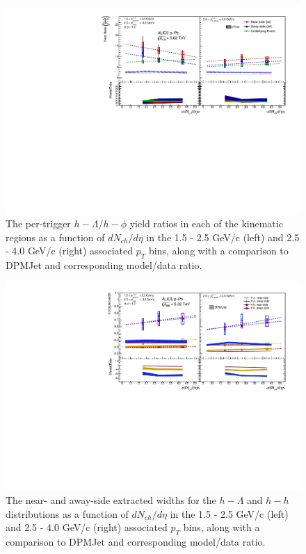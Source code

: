 \documentclass[ALICE,manyauthors]{ALICE_analysis_notes}
\begin{document}
\begin{figure}[ht]
\centering
\includegraphics[width=6in]{figures/final_lambda_phi_ratio_plot_new_x_axis_model_ratio.pdf}
\caption{The per-trigger $h-\Lambda$/$h-\phi$ yield ratios in each of the kinematic regions as a function of $dN_{ch}/d\eta$ in the 1.5 - 2.5 GeV/c (left) and 2.5 - 4.0 GeV/c (right) associated $p_{T}$ bins, along with a comparison to DPMJet and corresponding model/data ratio.}
\label{phi_ratio_final_figure}
\end{figure}
\clearpage

\begin{figure}[ht]
\centering
\includegraphics[width=6in]{figures/final_width_plot_new_x_axis_model_ratio.pdf}
\caption{The near- and away-side extracted widths for the $h-\Lambda$ and $h-h$ distributions as a function of $dN_{ch}/d\eta$ in the 1.5 - 2.5 GeV/c (left) and 2.5 - 4.0 GeV/c (right) associated $p_{T}$ bins, along with a comparison to DPMJet and corresponding model/data ratio.}
\label{width_final_figure}
\end{figure}
\clearpage
\end{document}
